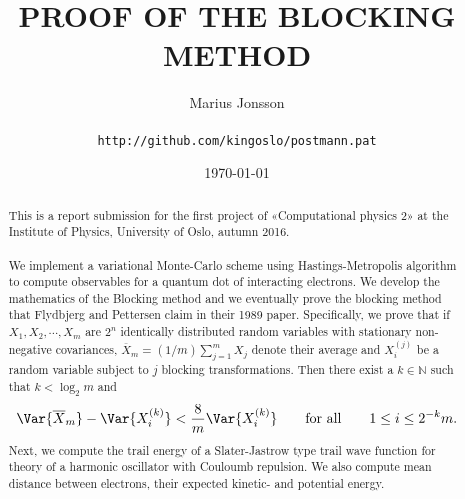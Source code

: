 \documentclass[11pt,english,a4paper]{article}
\author{\normalsize Marius Jonsson \\\\
\vspace{5px}
\normalsize \texttt{http://github.com/kingoslo/postmann.pat}}
\title{\bf \uppercase{Proof of the blocking method}}
\date{\normalsize \today}
\begin{document}
\maketitle
\begin{abstract} \normalsize This is a report submission for the first project of «Computational physics 2» at the Institute of Physics, University of Oslo, autumn 2016.\\
\\
We implement a variational Monte-Carlo scheme using Hastings-Metropolis algorithm to compute observables for a quantum dot of interacting electrons. We develop the mathematics of the Blocking method and we eventually prove the blocking method that Flydbjerg and Pettersen claim in their 1989 paper. Specifically, we prove that if $X_1,X_2,\cdots, X_m$ are $2^n$ identically distributed random variables with stationary non-negative covariances, $\overline X_m = (1/m)\sum_{j=1}^m X_j$ denote their average and $X^{(j)}_i$ be a random variable subject to $j$ blocking transformations. Then there exist a $k \in \mathbb{N}$ such that $k < \log_2 m$ and
\[
\Var{\overline X_m} - \Var{X^{(k)}_i} < \frac{8}{m}\Var{X^{(k)}_i} \qquad \text{for all} \qquad 1 \leq i \leq 2^{-k}m.
\]
Next, we compute the trail energy of a Slater-Jastrow type trail wave function for theory of a harmonic oscillator with Couloumb repulsion. We also compute mean distance between electrons, their expected kinetic- and potential energy.
\end{abstract}
\end{document}
